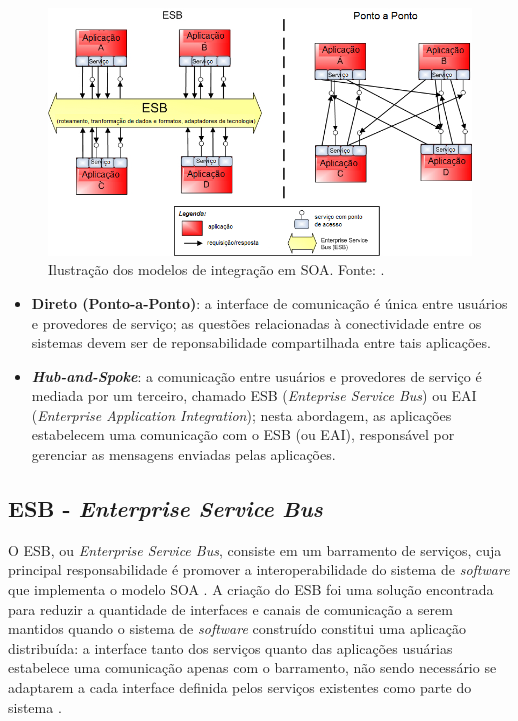 \begin{figure}[htb]
\centering
\includegraphics[scale=0.7]{figuras/modelos_integracao_soa.png}
\caption{Ilustração dos modelos de integração em SOA. Fonte: \cite{Bianco2007}.}
\label{modelos_integracao_soa}
\end{figure}

\begin{itemize}
\item \textbf{Direto (Ponto-a-Ponto)}: a interface de comunicação é única entre usuários e provedores de serviço; as questões relacionadas à conectividade entre os sistemas devem ser de reponsabilidade compartilhada entre tais aplicações.
\item \textbf{\textit{Hub-and-Spoke}}: a comunicação entre usuários e provedores de serviço é mediada por um terceiro, chamado ESB (\textit{Enteprise Service Bus}) ou EAI (\textit{Enterprise Application Integration}); nesta abordagem, as aplicações estabelecem uma comunicação com o ESB (ou EAI), responsável por gerenciar as mensagens enviadas pelas aplicações.
\end{itemize}

\subsection{ESB - \textit{Enterprise Service Bus}}

O ESB, ou \textit{Enterprise Service Bus}, consiste em um barramento de serviços, cuja principal responsabilidade é promover a interoperabilidade do sistema de \textit{software} que implementa o modelo SOA \cite{josuttis_soa_2007}. A criação do ESB foi uma solução encontrada para reduzir a quantidade de interfaces e canais de comunicação a serem mantidos quando o sistema de \textit{software} construído constitui uma aplicação distribuída: a interface tanto dos serviços quanto das aplicações usuárias estabelece uma comunicação apenas com o barramento, não sendo necessário se adaptarem a cada interface definida pelos serviços existentes como parte do sistema \cite{josuttis_soa_2007}.

